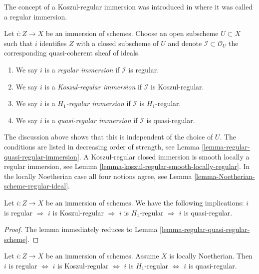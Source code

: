 \begin{definition}
\label{definition-regular-immersion}
\begin{reference}
The concept of a Koszul-regular immersion was introduced in
\cite[Expose VII, Definition 1.4]{SGA6} where it was called a
regular immersion.
\end{reference}
Let $i : Z \to X$ be an immersion of schemes. Choose an open subscheme
$U \subset X$ such that $i$ identifies $Z$ with a closed
subscheme of $U$ and denote $\mathcal{I} \subset \mathcal{O}_U$
the corresponding quasi-coherent sheaf of ideals.
\begin{enumerate}
\item We say $i$ is a {\it regular immersion} if
$\mathcal{I}$ is regular.
\item We say $i$ is a {\it Koszul-regular immersion} if
$\mathcal{I}$ is Koszul-regular.
\item We say $i$ is a {\it $H_1$-regular immersion} if
$\mathcal{I}$ is $H_1$-regular.
\item We say $i$ is a {\it quasi-regular immersion} if
$\mathcal{I}$ is quasi-regular.
\end{enumerate}
\end{definition}

\noindent
The discussion above shows that this is independent of the choice
of $U$. The conditions are listed in decreasing order of strength, see
Lemma \ref{lemma-regular-quasi-regular-immersion}.
A Koszul-regular closed immersion is smooth locally a regular immersion, see
Lemma \ref{lemma-koszul-regular-smooth-locally-regular}.
In the locally Noetherian case all four notions agree, see
Lemma \ref{lemma-Noetherian-scheme-regular-ideal}.

\begin{lemma}
\label{lemma-regular-quasi-regular-immersion}
Let $i : Z \to X$ be an immersion of schemes.
We have the following implications:
$i$ is regular $\Rightarrow$
$i$ is Koszul-regular $\Rightarrow$
$i$ is $H_1$-regular $\Rightarrow$
$i$ is quasi-regular.
\end{lemma}

\begin{proof}
The lemma immediately reduces to
Lemma \ref{lemma-regular-quasi-regular-scheme}.
\end{proof}

\begin{lemma}
\label{lemma-regular-immersion-noetherian}
Let $i : Z \to X$ be an immersion of schemes.
Assume $X$ is locally Noetherian. Then
$i$ is regular $\Leftrightarrow$
$i$ is Koszul-regular $\Leftrightarrow$
$i$ is $H_1$-regular $\Leftrightarrow$
$i$ is quasi-regular.
\end{lemma}

